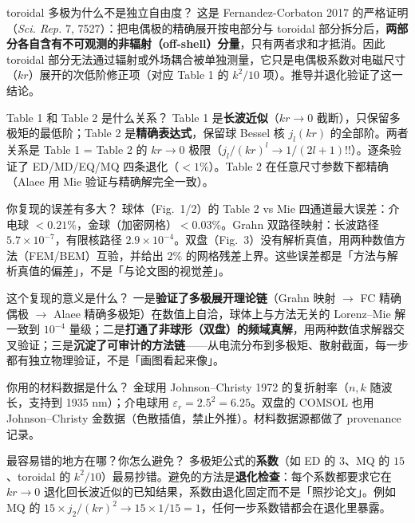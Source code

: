 \begin{qanda}{toroidal 多极为什么不是独立自由度？}
这是 Fernandez-Corbaton 2017 的严格证明（\emph{Sci. Rep.} 7, 7527）：把电偶极的精确展开按电部分与 toroidal 部分拆分后，\textbf{两部分各自含有不可观测的非辐射（off-shell）分量}，只有两者求和才抵消。因此 toroidal 部分无法通过辐射或外场耦合被单独测量，它只是电偶极系数对电磁尺寸（$kr$）展开的次低阶修正项（对应 Table 1 的 $k^2/10$ 项）。推导并退化验证了这一结论。
\end{qanda}

\begin{qanda}{Table 1 和 Table 2 是什么关系？}
Table 1 是\textbf{长波近似}（$kr\to0$ 截断），只保留多极矩的最低阶；Table 2 是\textbf{精确表达式}，保留球 Bessel 核 $j_l(kr)$ 的全部阶。两者关系是 Table 1 = Table 2 的 $kr\to0$ 极限（$j_l/(kr)^l\to1/(2l+1)!!$）。逐条验证了 ED/MD/EQ/MQ 四条退化（$<1\%$）。Table 2 在任意尺寸参数下都精确（Alaee 用 Mie 验证与精确解完全一致）。
\end{qanda}

\begin{qanda}{你复现的误差有多大？}
球体（Fig.~1/2）的 Table 2 vs Mie 四通道最大误差：介电球 $<0.21\%$，金球（加密网格）$<0.03\%$。Grahn 双路径映射：长波路径 $5.7\times10^{-7}$，有限核路径 $2.9\times10^{-4}$。双盘（Fig.~3）没有解析真值，用两种数值方法（FEM/BEM）互验，并给出 $2\%$ 的网格残差上界。这些误差都是「方法与解析真值的偏差」，不是「与论文图的视觉差」。
\end{qanda}

\begin{qanda}{这个复现的意义是什么？}
一是\textbf{验证了多极展开理论链}（Grahn 映射 $\to$ FC 精确偶极 $\to$ Alaee 精确多极矩）在数值上自洽，球体上与方法无关的 Lorenz--Mie 解一致到 $10^{-4}$ 量级；二是\textbf{打通了非球形（双盘）的频域真解}，用两种数值求解器交叉验证；三是\textbf{沉淀了可审计的方法链}——从电流分布到多极矩、散射截面，每一步都有独立物理验证，不是「画图看起来像」。
\end{qanda}

\begin{qanda}{你用的材料数据是什么？}
金球用 Johnson--Christy 1972 的复折射率（$n,k$ 随波长，支持到 1935 nm）；介电球用 $\varepsilon_r=2.5^2=6.25$。双盘的 COMSOL 也用 Johnson--Christy 金数据（色散插值，禁止外推）。材料数据源都做了 provenance 记录。
\end{qanda}

\begin{qanda}{最容易错的地方在哪？你怎么避免？}
多极矩公式的\textbf{系数}（如 ED 的 $3$、MQ 的 $15$、toroidal 的 $k^2/10$）最易抄错。避免的方法是\textbf{退化检查}：每个系数都要求它在 $kr\to0$ 退化回长波近似的已知结果，系数由退化固定而不是「照抄论文」。例如 MQ 的 $15\times j_2/(kr)^2\to15\times1/15=1$，任何一步系数错都会在退化里暴露。
\end{qanda}
